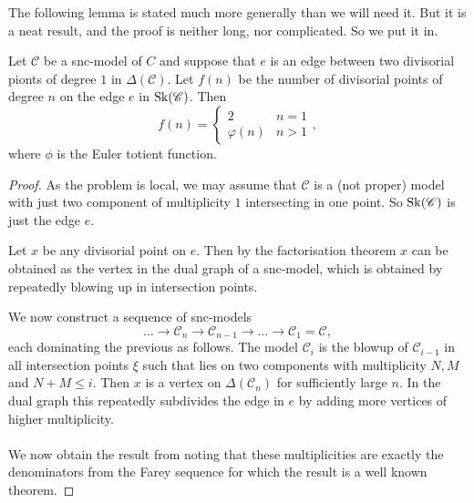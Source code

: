 The following lemma is stated much more generally than we will need it. 
But it is a neat result, and the proof is neither long, nor complicated. So we put it in. 
\begin{lemma}\label{lem:number_divisorial_points}
	Let $\mathscr C$ be a snc-model of  $C$ and suppose that $e$ is an edge between two divisorial pionts of degree $1$ in $\Delta(\mathscr C)$. 
	Let $f(n)$ be the number of divisorial points of degree $n$ on the edge  $e$ in $\operatorname{Sk}(\mathscr C)$. 
	Then \[
		f(n) = \begin{cases}
			2 & n = 1 \\
			\varphi(n) & n > 1
		\end{cases}
	,\] 
	where $\phi$ is the Euler totient function. 
\end{lemma}
\begin{proof}
	As the problem is local, we may assume that $\mathscr C$ is a (not proper) model with just two component of multiplicity $1$ intersecting in one point. 
	So $\operatorname{Sk}(\mathscr C)$ is just the edge $e$. 

	Let $x$ be any divisorial point on $e$. 
	Then by the factorisation theorem $x$ can be obtained as the vertex in the dual graph of a snc-model, which is obtained by repeatedly blowing up in intersection points. 

	We now construct a sequence of snc-models \[
	\ldots \to 	\mathscr C_n \to \mathscr C_{n -1} \to \ldots \to \mathscr C_1 = \mathscr C
,\]
each dominating the previous as follows. 
The model  $\mathscr C_i$ is the blowup of $\mathscr C_{i-1}$ in all intersection points $\xi$ such that lies on two components with multiplicity $N, M$ and $N + M \le i$. 
Then $x$ is a vertex on $\Delta(\mathscr C_n)$ for sufficiently large $n$.
In the dual graph this repeatedly subdivides the edge in $e$ by adding more vertices of higher multiplicity. 
\\
\noindent{}
\\
We now obtain the result from noting that these multiplicities are exactly the denominators from the Farey sequence for which the result is a well known theorem. 
\end{proof}



